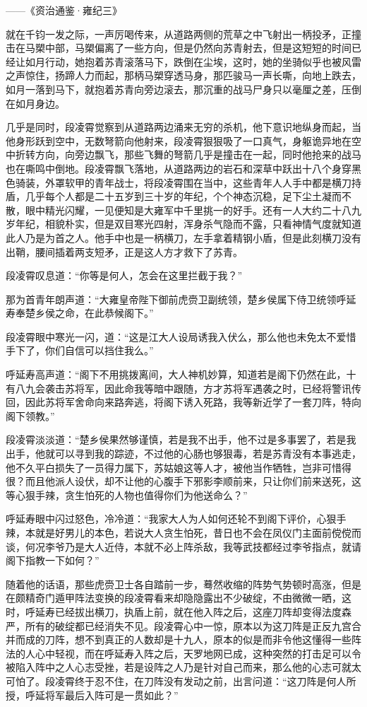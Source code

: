 ——《资治通鉴·雍纪三》

就在千钧一发之际，一声厉喝传来，从道路两侧的荒草之中飞射出一柄投矛，正撞击在马槊中部，马槊偏离了一些方向，但是仍然向苏青射去，但是这短短的时间已经让如月行动，她抱着苏青滚落马下，跌倒在尘埃，这时，她的坐骑似乎也被风雷之声惊住，扬蹄人力而起，那柄马槊穿透马身，那匹骏马一声长嘶，向地上跌去，如月一落到马下，就抱着苏青向旁边滚去，那沉重的战马尸身只以毫厘之差，压倒在如月身边。

几乎是同时，段凌霄觉察到从道路两边涌来无穷的杀机，他下意识地纵身而起，当他身形跃到空中，无数弩箭向他射来，段凌霄狠狠吸了一口真气，身躯诡异地在空中折转方向，向旁边飘飞，那些飞舞的弩箭几乎是撞击在一起，同时他抢来的战马也在嘶鸣中倒地。段凌霄飘飞落地，从道路两边的岩石和深草中跃出十八个身穿黑色骑装，外罩软甲的青年战士，将段凌霄围在当中，这些青年人人手中都是横刀持盾，几乎每个人都是二十五岁到三十岁的年纪，个个神态沉稳，足下尘土凝而不散，眼中精光闪耀，一见便知是大雍军中千里挑一的好手。还有一人大约二十八九岁年纪，相貌朴实，但是双目寒光四射，浑身杀气隐而不露，只看神情气度就知道此人乃是为首之人。他手中也是一柄横刀，左手拿着精钢小盾，但是此刻横刀没有出鞘，腰间插着两支短矛，正是这人方才救下了苏青。

段凌霄叹息道：“你等是何人，怎会在这里拦截于我？”

那为首青年朗声道：“大雍皇帝陛下御前虎赍卫副统领，楚乡侯属下侍卫统领呼延寿奉楚乡侯之命，在此恭候阁下。”

段凌霄眼中寒光一闪，道：“这是江大人设局诱我入伏么，那么他也未免太不爱惜手下了，你们自信可以挡住我么。”

呼延寿高声道：“阁下不用挑拨离间，大人神机妙算，知道若是阁下仍然在此，十有八九会袭击苏将军，因此命我等暗中跟随，方才苏将军遇袭之时，已经将警讯传回，因此苏将军舍命向来路奔逃，将阁下诱入死路，我等新近学了一套刀阵，特向阁下领教。”

段凌霄淡淡道：“楚乡侯果然够谨慎，若是我不出手，他不过是多事罢了，若是我出手，他就可以寻到我的踪迹，不过他的心肠也够狠毒，若是苏青没有本事逃走，他不久平白损失了一员得力属下，苏姑娘这等人才，被他当作牺牲，岂非可惜得很？而且他派人设伏，却不让他的心腹手下邪影李顺前来，只让你们前来送死，这等心狠手辣，贪生怕死的人物也值得你们为他送命么？”

呼延寿眼中闪过怒色，冷冷道：“我家大人为人如何还轮不到阁下评价，心狠手辣，本就是好男儿的本色，若说大人贪生怕死，昔日也不会在凤仪门主面前傥傥而谈，何况李爷乃是大人近侍，本就不必上阵杀敌，我等武技都经过李爷指点，就请阁下指教一下如何？”

随着他的话语，那些虎赍卫士各自踏前一步，蓦然收缩的阵势气势顿时高涨，但是在颇精奇门遁甲阵法变换的段凌霄看来却隐隐露出不少破绽，不由微微一晒，这时，呼延寿已经拔出横刀，执盾上前，就在他入阵之后，这座刀阵却变得法度森严，所有的破绽都已经消失不见。段凌霄心中一惊，原本以为这刀阵是正反九宫合并而成的刀阵，想不到真正的人数却是十九人，原本的似是而非令他这懂得一些阵法的人心中轻视，而在呼延寿入阵之后，天罗地网已成，这种突然的打击足可以令被陷入阵中之人心志受挫，若是设阵之人乃是针对自己而来，那么他的心志可就太可怕了。段凌霄终于忍不住，在刀阵没有发动之前，出言问道：“这刀阵是何人所授，呼延将军最后入阵可是一贯如此？”

